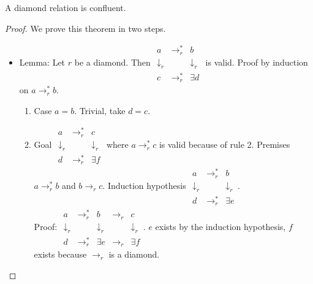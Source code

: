 \begin{theorem}
  \label{th:diamondconfluent}
  A diamond relation is confluent.
  \begin{proof}
    We prove this theorem in two steps.
    \begin{itemize}
    \item Lemma: Let $r$ be a diamond. Then
      $\begin{matrix}
        a                     &    \to_r^*    &    b \\
        \downarrow_r &                   & \downarrow_r \\
        c                     & \to_r^*       & \exists d
      \end{matrix}$ is valid.
      Proof by induction on $a \to_r^* b$.
      \begin{enumerate}
      \item
        Case $a = b$. Trivial, take $d=c$.
      \item
        Goal $\begin{matrix}
          a                     &    \to_r^*    &    c \\
          \downarrow_r &                   & \downarrow_r \\
          d                     & \to_r^*       & \exists f
        \end{matrix}$ where $a \to_r^* c$ is valid because of rule 2.
        Premises $a \to_r^* b$ and $b \to_r c$.
        Induction hypothesis
        $\begin{matrix}
          a                     &    \to_r^*    &    b \\
          \downarrow_r &                   & \downarrow_r \\
          d                     & \to_r^*       & \exists e
        \end{matrix}$.
        \\
        Proof:
        $\begin{matrix}
          a                     & \to_r^* & b                     & \to_r & c\\
          \downarrow_r &             & \downarrow_r &          & \downarrow_r\\
          d                     & \to_r^* & \exists e        & \to_r & \exists f
        \end{matrix}$. $e$ exists by the induction hypothesis, $f$ exists because
        $\to_r$ is a diamond.
      \end{enumerate}


\end{itemize}
\end{proof}
\end{theorem}
